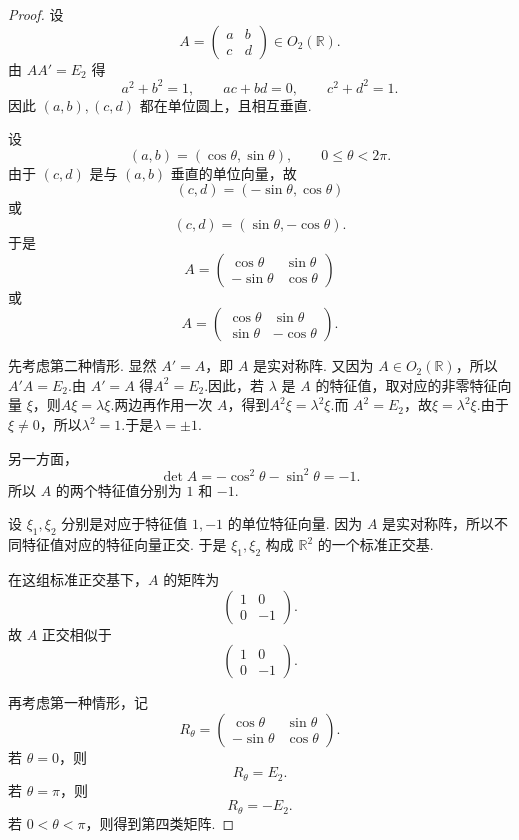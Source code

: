 \begin{proof}
	设
	\[
	A=
	\begin{pmatrix}
		a&b\\
		c&d
	\end{pmatrix}
	\in O_2(\mathbb R).
	\]
	由 $AA'=E_2$ 得
	\[
	a^2+b^2=1,\qquad ac+bd=0,\qquad c^2+d^2=1.
	\]
	因此 $(a,b),(c,d)$ 都在单位圆上，且相互垂直.
	
	设
	\[
	(a,b)=(\cos\theta,\sin\theta),
	\qquad 0\leq \theta<2\pi.
	\]
	由于 $(c,d)$ 是与 $(a,b)$ 垂直的单位向量，故
	\[
	(c,d)=(-\sin\theta,\cos\theta)
	\]
	或
	\[
	(c,d)=(\sin\theta,-\cos\theta).
	\]
	于是
	\[
	A=
	\begin{pmatrix}
		\cos\theta&\sin\theta\\
		-\sin\theta&\cos\theta
	\end{pmatrix}
	\]
	或
	\[
	A=
	\begin{pmatrix}
		\cos\theta&\sin\theta\\
		\sin\theta&-\cos\theta
	\end{pmatrix}.
	\]
	
	先考虑第二种情形. 
	显然 $A'=A$，即 $A$ 是实对称阵. 又因为 $A\in O_2(\mathbb R)$，所以$	A'A=E_2.$由 $A'=A$ 得$A^2=E_2.$因此，若 $\lambda$ 是 $A$ 的特征值，取对应的非零特征向量 $\xi$，则$	A\xi=\lambda\xi.$两边再作用一次 $A$，得到$	A^2\xi=\lambda^2\xi.$而 $A^2=E_2$，故$\xi=\lambda^2\xi.$由于 $\xi\ne 0$，所以$\lambda^2=1.$于是$\lambda=\pm 1.$
	
	
	另一方面，
	\[
	\det A
	=
	-\cos^2\theta-\sin^2\theta
	=
	-1.
	\]
	所以 $A$ 的两个特征值分别为 $1$ 和 $-1$.
	
	设 $\xi_1,\xi_2$ 分别是对应于特征值 $1,-1$ 的单位特征向量. 
	因为 $A$ 是实对称阵，所以不同特征值对应的特征向量正交. 
	于是 $\xi_1,\xi_2$ 构成 $\mathbb R^2$ 的一个标准正交基.
	
	在这组标准正交基下，$A$ 的矩阵为
	\[
	\begin{pmatrix}
		1&0\\
		0&-1
	\end{pmatrix}.
	\]
	故 $A$ 正交相似于
	\[
	\begin{pmatrix}
		1&0\\
		0&-1
	\end{pmatrix}.
	\]
	
	再考虑第一种情形，记
	\[
	R_\theta=
	\begin{pmatrix}
		\cos\theta&\sin\theta\\
		-\sin\theta&\cos\theta
	\end{pmatrix}.
	\]
	若 $\theta=0$，则
	\[
	R_\theta=E_2.
	\]
	若 $\theta=\pi$，则
	\[
	R_\theta=-E_2.
	\]
	若 $0<\theta<\pi$，则得到第四类矩阵.
	

\end{proof}
